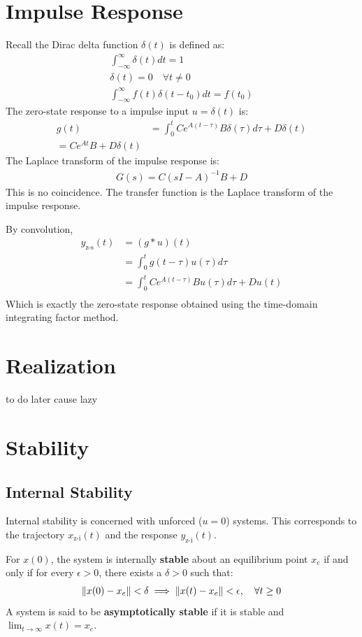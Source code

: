 \documentclass[letterpaper,12pt]{article}
\begin{document}
\section{Impulse Response}
Recall the Dirac delta function $\delta(t)$ is defined as:
\begin{align*}
    \int_{-\infty}^{\infty} \delta(t) dt = 1 \\
    \delta(t) = 0 \quad \forall t \neq 0 \\
    \int_{-\infty}^{\infty} f(t)\delta(t-t_0) dt = f(t_0)
\end{align*}
The zero-state response to a impulse input $u = \delta(t)$ is:
\begin{align*}
    g(t) &= \int_{0}^{t} C e^{A(t-\tau)}B \delta(\tau) d\tau + D \delta(t) \\
    = C e^{At}B + D \delta(t)
\end{align*}
The Laplace transform of the impulse response is:
\begin{align*}
    G(s) = C(sI - A)^{-1}B + D
\end{align*}
This is no coincidence. The transfer function is the Laplace transform of the
impulse response.

By convolution,
\begin{align*}
    y_{\text{z-s}}(t) &= (g * u)(t) \\
    &= \int_{0}^{t} g(t - \tau) u(\tau) d\tau \\
    &= \int_{0}^{t} C e^{A(t-\tau)}B u(\tau) d\tau + D u(t) \\
\end{align*}
Which is exactly the zero-state response obtained using the time-domain integrating
factor method.

\section{Realization}
to do later cause lazy

\section{Stability}
\subsection{Internal Stability}
Internal stability is concerned with unforced ($u=0$) systems. This corresponds to the trajectory $x_{\text{z-i}}(t)$ and the response $y_{\text{z-i}}(t)$.

For $x(0)$, the system is internally \textbf{stable} about an equilibrium point $x_e$ if and only if for every $\epsilon > 0$, there exists a $\delta > 0$ such that:
\begin{align*}
    \norm{x(0) - x_e} < \delta \implies \norm{x(t) - x_e} < \epsilon, \quad \forall t \geq 0
\end{align*}
A system is said to be \textbf{asymptotically stable} if it is stable and $\lim_{t\to\infty} x(t) = x_e$.
\end{document}
